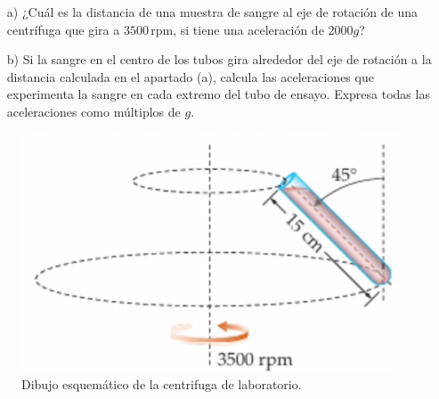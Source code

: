 \documentclass{replab}
\begin{document}

\begin{enumerate}
	\item[a)] ¿Cuál es la distancia de una muestra de sangre al eje de rotación de una centrífuga que gira a $3500\,\text{rpm}$, si tiene una aceleración de $2000g$?

	\item[b)] Si la sangre en el centro de los tubos gira alrededor del eje de rotación a la distancia calculada en el apartado (a), calcula las aceleraciones que experimenta la sangre en cada extremo del tubo de ensayo. Expresa todas las aceleraciones como múltiplos de $g$.
\end{enumerate}


\begin{figure}[htbp]
	\centering
	\includegraphics[width=.4\columnwidth]{imagenes/centrifuga.png}
	\caption{Dibujo esquemático de la centrifuga de laboratorio.}
	\label{fig:centrifuga}
\end{figure}



\printbibliography[heading=bibintoc]
	
\end{document}

